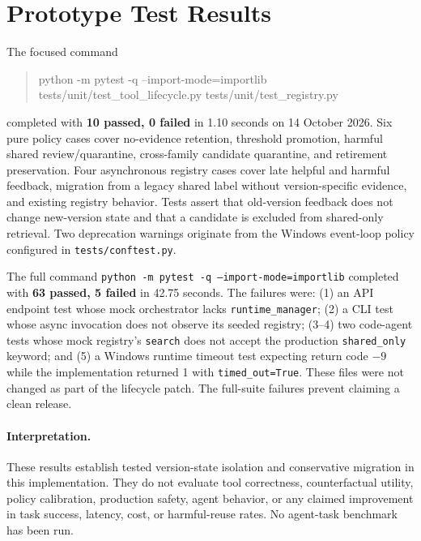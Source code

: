 \documentclass[11pt]{article}
\begin{document}
\section{Prototype Test Results}
The focused command
\begin{quote}\ttfamily python -m pytest -q --import-mode=importlib tests/unit/test\_tool\_lifecycle.py tests/unit/test\_registry.py\end{quote}
completed with \textbf{10 passed, 0 failed} in 1.10 seconds on 14 October 2026. Six pure policy cases cover no-evidence retention, threshold promotion, harmful shared review/quarantine, cross-family candidate quarantine, and retirement preservation. Four asynchronous registry cases cover late helpful and harmful feedback, migration from a legacy shared label without version-specific evidence, and existing registry behavior. Tests assert that old-version feedback does not change new-version state and that a candidate is excluded from shared-only retrieval. Two deprecation warnings originate from the Windows event-loop policy configured in \texttt{tests/conftest.py}.

The full command \texttt{python -m pytest -q --import-mode=importlib} completed with \textbf{63 passed, 5 failed} in 42.75 seconds. The failures were: (1) an API endpoint test whose mock orchestrator lacks \texttt{runtime\_manager}; (2) a CLI test whose async invocation does not observe its seeded registry; (3--4) two code-agent tests whose mock registry's \texttt{search} does not accept the production \texttt{shared\_only} keyword; and (5) a Windows runtime timeout test expecting return code $-9$ while the implementation returned 1 with \texttt{timed\_out=True}. These files were not changed as part of the lifecycle patch. The full-suite failures prevent claiming a clean release.

\paragraph{Interpretation.} These results establish tested version-state isolation and conservative migration in this implementation. They do not evaluate tool correctness, counterfactual utility, policy calibration, production safety, agent behavior, or any claimed improvement in task success, latency, cost, or harmful-reuse rates. No agent-task benchmark has been run.
\end{document}
